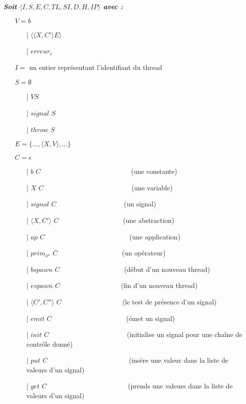 \documentclass[10pt,a4paper]{article}
\begin{document}
			\textbf{\textit{Soit $\langle I,S,E,C,TL,SI,D,H,IP\rangle$ avec :}}
			
			\begin{itemize}
				\item[] $V = b$	
				\begin{itemize}
					\item[|] $\langle\langle X,C' \rangle E\rangle$
					\item[|] $erreur_{e}$
				\end{itemize}
				\item[] $I =$ un entier représentant l'identifiant du thread
				\item[] $S =  \emptyset$ 
				\begin{itemize}
					\item[|] $V S$
					\item[|] $signal$ $S$
					\item[|] $throw$ $S$
				\end{itemize}
				\item[] $E = \{...,\langle X,V\rangle,...\}$
				\item[] $C = \epsilon$
				\begin{itemize}
					\item[|] $b$ $C$~~~~~~~~~~~~~~~~~~~~~~~~~~    (une constante)
					\item[|] $X$ $C$~~~~~~~~~~~~~~~~~~~~~~~~~~(une variable)
					\item[|] $signal$ $C$~~~~~~~~~~~~~~~~~~~~(un signal)
					\item[|] $\langle X,C'\rangle$ $C$~~~~~~~~~~~~~~~~~~~(une abstraction)
					\item[|] $ap$ $C$~~~~~~~~~~~~~~~~~~~~~~~~~(une application)
					\item[|] $prim_{o^{n}}$ $C$~~~~~~~~~~~~~~~~~~~(un opérateur)
					\item[|] $bspawn$ $C$~~~~~~~~~~~~~~~~~~~(début d'un nouveau thread)
					\item[|] $espawn$ $C$~~~~~~~~~~~~~~~~~~(fin d'un nouveau thread)
					\item[|] $\langle C',C''\rangle$ $C$~~~~~~~~~~~~~~~~~~(le test de présence d'un signal)
					\item[|] $emit$ $C$~~~~~~~~~~~~~~~~~~~~~~(émet un signal)
					\item[|] $init$ $C$~~~~~~~~~~~~~~~~~~~~~~~(initialise un signal pour une chaîne de contrôle donné)
					\item[|] $put$ $C$~~~~~~~~~~~~~~~~~~~~~~~~(insère une valeur dans la liste de valeurs d'un signal)
					\item[|] $get$ $C$~~~~~~~~~~~~~~~~~~~~~~~~(prends une valeurs dans la liste de valeurs d'un signal)

\end{itemize}
\end{itemize}
\end{document}
